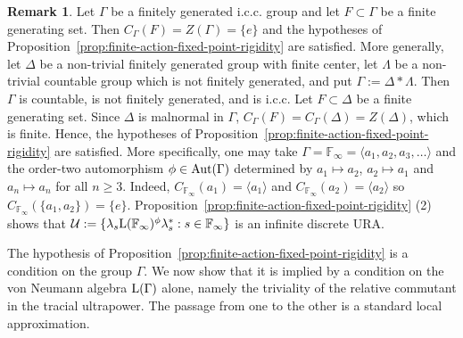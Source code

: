 \documentclass[12pt]{amsart} %
\theoremstyle{plain}
\theoremstyle{definition}
\newtheorem{remark}[theorem]{Remark}
\newcommand{\LL}{{\rm L}}
\newcommand{\F}{\mathbb{F}}
\newcommand{\Aut}{{\rm Aut}}
\begin{document}
\begin{remark}\label{rmk:finite-centralizer-examples}
Let $\Gamma$ be a finitely generated i.c.c. group and let $F\subset\Gamma$ be
a finite generating set. Then $C_\Gamma(F)=Z(\Gamma)=\{e\}$ and the hypotheses of
Proposition~\ref{prop:finite-action-fixed-point-rigidity} are satisfied.
\medskip
\noindent More generally, let $\Delta$ be a non-trivial finitely generated group with finite
center, let $\Lambda$ be a non-trivial countable group which is not finitely
generated, and put $\Gamma:=\Delta*\Lambda$. Then $\Gamma$ is countable, is not finitely generated, and is i.c.c. Let
$F\subset\Delta$ be a finite generating set. Since $\Delta$ is malnormal in $\Gamma$, $C_\Gamma(F)=C_\Gamma(\Delta)=Z(\Delta)$, which is finite. Hence, the hypotheses of
Proposition~\ref{prop:finite-action-fixed-point-rigidity} are satisfied.
\medskip
\noindent More specifically, one may take $\Gamma=\F_\infty=\langle a_1,a_2,a_3,\ldots\rangle$ and the order-two automorphism $\phi\in\Aut(\Gamma)$ determined by
$a_1\mapsto a_2$, $a_2\mapsto a_1$ and $a_n\mapsto a_n$ for all $n\geq3$. Indeed, $C_{\F_\infty}(a_1)=\langle a_1\rangle$ and $C_{\F_\infty}(a_2)=\langle a_2\rangle$ so $C_{\F_\infty}(\{a_1,a_2\})=\{e\}$. Proposition~\ref{prop:finite-action-fixed-point-rigidity} {\rm(2)} shows that $\mathcal U:=\{\lambda_s\LL(\mathbb{F}_\infty)^\phi\lambda_s^*:s\in\mathbb{F}_\infty\}$ is an infinite discrete URA.
\end{remark}

\noindent The hypothesis of
Proposition~\ref{prop:finite-action-fixed-point-rigidity} is a condition on the
group $\Gamma$. We now show that it is implied by a condition on the von Neumann
algebra $\LL(\Gamma)$ alone, namely the triviality of the relative commutant in
the tracial ultrapower. The passage from one to the other is a standard local
approximation.
\end{document}
